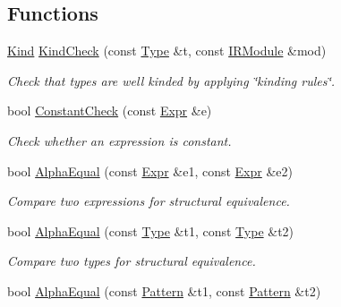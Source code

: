 \subsection*{Functions}
\begin{DoxyCompactItemize}
\item 
\hyperlink{namespacetvm_acd267f8d7f55da6ac681239831963279}{Kind} \hyperlink{namespacetvm_1_1relay_af73e45f453515df6f9c0bbbf189719d6}{Kind\+Check} (const \hyperlink{namespacetvm_1_1relay_a661d95f170bca230773914caeef3fe52}{Type} \&t, const \hyperlink{classtvm_1_1IRModule}{I\+R\+Module} \&mod)
\begin{DoxyCompactList}\small\item\em Check that types are well kinded by applying \char`\"{}kinding rules\char`\"{}. \end{DoxyCompactList}\item 
bool \hyperlink{namespacetvm_1_1relay_abdade48285a63efffe743e73e41d3b35}{Constant\+Check} (const \hyperlink{namespacetvm_1_1relay_a5b84e3790f89bb3fad5c7911eeb99531}{Expr} \&e)
\begin{DoxyCompactList}\small\item\em Check whether an expression is constant. \end{DoxyCompactList}\item 
bool \hyperlink{namespacetvm_1_1relay_ade8a41f4d5e1698684fe03446776c799}{Alpha\+Equal} (const \hyperlink{namespacetvm_1_1relay_a5b84e3790f89bb3fad5c7911eeb99531}{Expr} \&e1, const \hyperlink{namespacetvm_1_1relay_a5b84e3790f89bb3fad5c7911eeb99531}{Expr} \&e2)
\begin{DoxyCompactList}\small\item\em Compare two expressions for structural equivalence. \end{DoxyCompactList}\item 
bool \hyperlink{namespacetvm_1_1relay_a396e72c6921843a960ac588a8c60253d}{Alpha\+Equal} (const \hyperlink{namespacetvm_1_1relay_a661d95f170bca230773914caeef3fe52}{Type} \&t1, const \hyperlink{namespacetvm_1_1relay_a661d95f170bca230773914caeef3fe52}{Type} \&t2)
\begin{DoxyCompactList}\small\item\em Compare two types for structural equivalence. \end{DoxyCompactList}\item 
bool \hyperlink{namespacetvm_1_1relay_a4e98128c160e24833fdba44345ad3ba3}{Alpha\+Equal} (const \hyperlink{classtvm_1_1relay_1_1Pattern}{Pattern} \&t1, const \hyperlink{classtvm_1_1relay_1_1Pattern}{Pattern} \&t2)

\end{DoxyCompactItemize}

